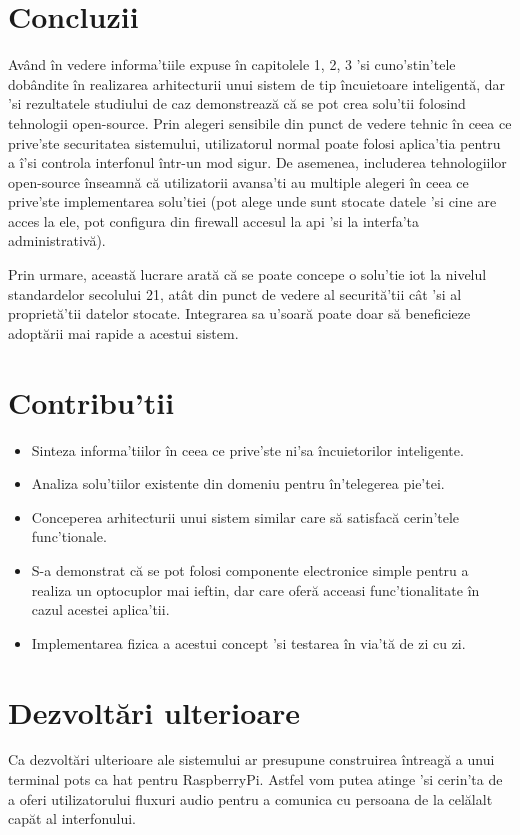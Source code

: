 \section{Concluzii}

Având în vedere informa'tiile expuse în capitolele 1, 2, 3 'si cuno'stin'tele dobândite în realizarea arhitecturii unui sistem de tip încuietoare inteligentă, dar 'si rezultatele studiului de caz demonstrează că se pot crea solu'tii folosind tehnologii open-source. Prin alegeri sensibile din punct de vedere tehnic în ceea ce prive'ste securitatea sistemului, utilizatorul normal poate folosi aplica'tia pentru a î'si controla interfonul într-un mod sigur. De asemenea, includerea tehnologiilor open-source înseamnă că utilizatorii avansa'ti au multiple alegeri în ceea ce prive'ste implementarea solu'tiei (pot alege unde sunt stocate datele 'si cine are acces la ele, pot configura din firewall accesul la \acrshort{api} 'si la interfa'ta administrativă).

Prin urmare, această lucrare arată că se poate concepe o solu'tie \acrshort{iot} la nivelul standardelor secolului 21, atât din punct de vedere al securită'tii cât 'si al proprietă'tii datelor stocate. Integrarea sa u'soară poate doar să beneficieze adoptării mai rapide a acestui sistem.

\section{Contribu'tii}

\begin{itemize}
  \item Sinteza informa'tiilor în ceea ce prive'ste ni'sa încuietorilor inteligente.
  \item Analiza solu'tiilor existente din domeniu pentru în'telegerea pie'tei.
  \item Conceperea arhitecturii unui sistem similar care să satisfacă cerin'tele func'tionale.
  \item S-a demonstrat că se pot folosi componente electronice simple pentru a realiza un optocuplor mai ieftin, dar care oferă acceasi func'tionalitate în cazul acestei aplica'tii.
  \item Implementarea fizica a acestui concept 'si testarea în via'tă de zi cu zi.
\end{itemize}

\section{Dezvoltări ulterioare}

Ca dezvoltări ulterioare ale sistemului ar presupune construirea întreagă a unui terminal \acrshort{pots} ca \acrshort{hat} pentru RaspberryPi. Astfel vom putea atinge 'si cerin'ta de a oferi utilizatorului fluxuri audio pentru a comunica cu persoana de la celălalt capăt al interfonului. 